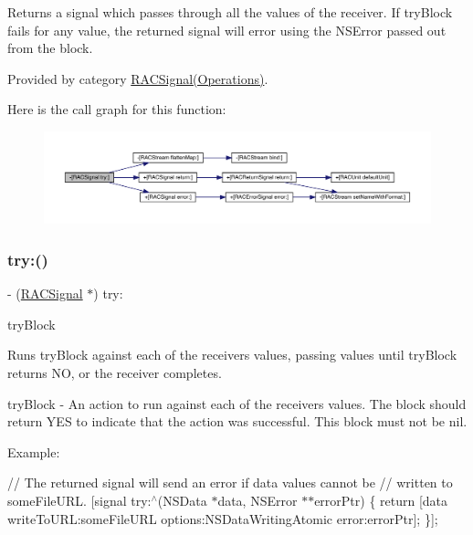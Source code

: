 Returns a signal which passes through all the values of the receiver. If {\ttfamily try\+Block} fails for any value, the returned signal will error using the {\ttfamily N\+S\+Error} passed out from the block. 

Provided by category \mbox{\hyperlink{category_r_a_c_signal_07_operations_08_ac65d7a1a19db9cb2f78c03781995bbe9}{R\+A\+C\+Signal(\+Operations)}}.

Here is the call graph for this function\+:\nopagebreak
\begin{figure}[H]
\begin{center}
\leavevmode
\includegraphics[width=350pt]{interface_r_a_c_signal_ac65d7a1a19db9cb2f78c03781995bbe9_cgraph}
\end{center}
\end{figure}
\mbox{\label{interface_r_a_c_signal_ac65d7a1a19db9cb2f78c03781995bbe9}} 
\subsubsection{\texorpdfstring{try\+:()}{try:()}\hspace{0.1cm}{\footnotesize\ttfamily [2/3]}}
{\footnotesize\ttfamily -\/ (\mbox{\hyperlink{interface_r_a_c_signal}{R\+A\+C\+Signal}} $\ast$) try\+: \begin{DoxyParamCaption}\item[{(B\+O\+OL($^\wedge$)(id value, N\+S\+Error $\ast$$\ast$error\+Ptr))}]{try\+Block }\end{DoxyParamCaption}}

Runs {\ttfamily try\+Block} against each of the receiver\textquotesingle{}s values, passing values until {\ttfamily try\+Block} returns NO, or the receiver completes.

try\+Block -\/ An action to run against each of the receiver\textquotesingle{}s values. The block should return Y\+ES to indicate that the action was successful. This block must not be nil.

Example\+:

// The returned signal will send an error if data values cannot be // written to {\ttfamily some\+File\+U\+RL}. \mbox{[}signal try\+:$^\wedge$(N\+S\+Data $\ast$data, N\+S\+Error $\ast$$\ast$error\+Ptr) \{ return \mbox{[}data write\+To\+U\+RL\+:some\+File\+U\+RL options\+:N\+S\+Data\+Writing\+Atomic error\+:error\+Ptr\mbox{]}; \}\mbox{]};

